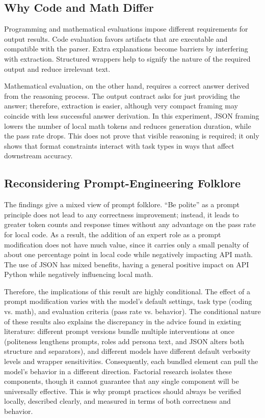 \documentclass{llncs}
\begin{document}
\subsection{Why Code and Math Differ}\label{why-code-and-math-differ}

Programming and mathematical evaluations impose different requirements for output results. Code evaluation favors artifacts that are executable and compatible with the parser. Extra explanations become barriers by interfering with extraction. Structured wrappers help to signify the nature of the required output and reduce irrelevant text.

Mathematical evaluation, on the other hand, requires a correct answer derived from the reasoning process. The output contract asks for just providing the answer; therefore, extraction is easier, although very compact framing may coincide with less successful answer derivation. In this experiment, JSON framing lowers the number of local math tokens and reduces generation duration, while the pass rate drops. This does not prove that visible reasoning is required; it only shows that format constraints interact with task types in ways that affect downstream accuracy.

\subsection{Reconsidering Prompt-Engineering Folklore}\label{reconsidering-prompt-engineering-folklore}

The findings give a mixed view of prompt folklore. “Be polite” as a prompt principle does not lead to any correctness improvement; instead, it leads to greater token counts and response times without any advantage on the pass rate for local code. As a result, the addition of an expert role as a prompt modification does not have much value, since it carries only a small penalty of about one percentage point in local code while negatively impacting API math. The use of JSON has mixed benefits, having a general positive impact on API Python while negatively influencing local math.

Therefore, the implications of this result are highly conditional. The effect of a prompt modification varies with the model's default settings, task type (coding vs. math), and evaluation criteria (pass rate vs. behavior). The conditional nature of these results also explains the discrepancy in the advice found in existing literature: different prompt versions bundle multiple interventions at once (politeness lengthens prompts, roles add persona text, and JSON alters both structure and separators), and different models have different default verbosity levels and wrapper sensitivities. Consequently, each bundled element can pull the model's behavior in a different direction. Factorial research isolates these components, though it cannot guarantee that any single component will be universally effective. This is why prompt practices should always be verified locally, described clearly, and measured in terms of both correctness and behavior.
\end{document}
